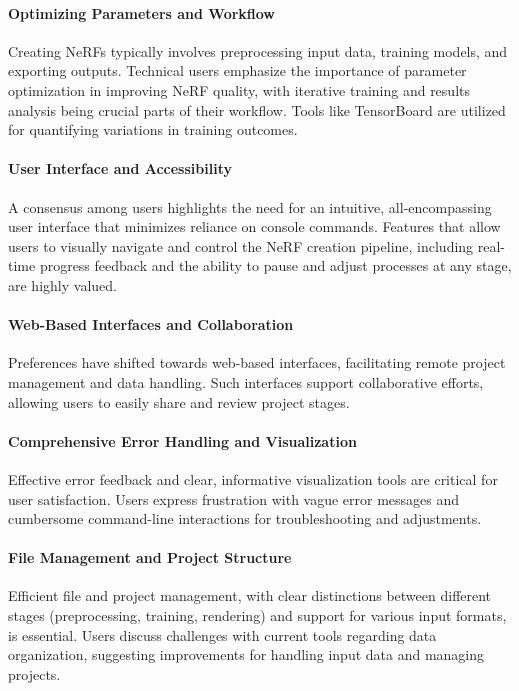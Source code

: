 \paragraph{Optimizing Parameters and Workflow}

Creating NeRFs typically involves preprocessing input data, training models, and exporting outputs. 
Technical users emphasize the importance of parameter optimization in improving NeRF quality, with iterative training and results analysis being crucial parts of their workflow. 
Tools like TensorBoard are utilized for quantifying variations in training outcomes.

\paragraph{User Interface and Accessibility}

A consensus among users highlights the need for an intuitive, all-encompassing user interface that minimizes reliance on console commands. 
Features that allow users to visually navigate and control the NeRF creation pipeline, including real-time progress feedback and the ability to pause and adjust processes at any stage, are highly valued.

\paragraph{Web-Based Interfaces and Collaboration}

Preferences have shifted towards web-based interfaces, facilitating remote project management and data handling. 
Such interfaces support collaborative efforts, allowing users to easily share and review project stages.

\paragraph{Comprehensive Error Handling and Visualization}

Effective error feedback and clear, informative visualization tools are critical for user satisfaction. 
Users express frustration with vague error messages and cumbersome command-line interactions for troubleshooting and adjustments.

\paragraph{File Management and Project Structure}

Efficient file and project management, with clear distinctions between different stages (preprocessing, training, rendering) and support for various input formats, is essential. 
Users discuss challenges with current tools regarding data organization, suggesting improvements for handling input data and managing projects​​.


